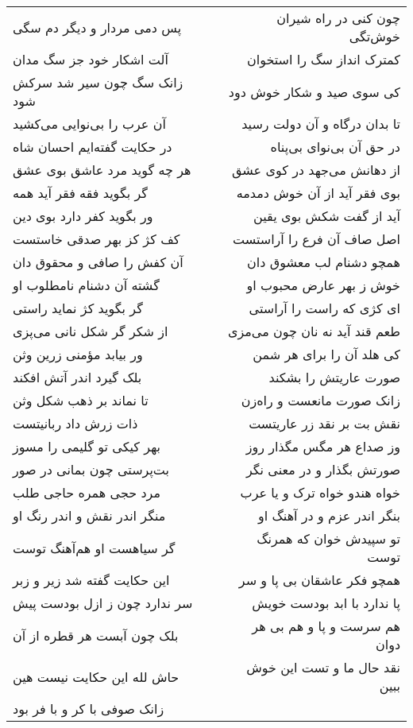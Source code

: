 \begin{center}
\begin{longtable}{l p{0.5cm} r}
\\
پس دمی مردار و دیگر دم سگی
&&
چون کنی در راه شیران خوش‌تگی
\\
آلت اشکار خود جز سگ مدان
&&
کمترک انداز سگ را استخوان
\\
زانک سگ چون سیر شد سرکش شود
&&
کی سوی صید و شکار خوش دود
\\
آن عرب را بی‌نوایی می‌کشید
&&
تا بدان درگاه و آن دولت رسید
\\
در حکایت گفته‌ایم احسان شاه
&&
در حق آن بی‌نوای بی‌پناه
\\
هر چه گوید مرد عاشق بوی عشق
&&
از دهانش می‌جهد در کوی عشق
\\
گر بگوید فقه فقر آید همه
&&
بوی فقر آید از آن خوش دمدمه
\\
ور بگوید کفر دارد بوی دین
&&
آید از گفت شکش بوی یقین
\\
کف کژ کز بهر صدقی خاستست
&&
اصل صاف آن فرع را آراستست
\\
آن کفش را صافی و محقوق دان
&&
همچو دشنام لب معشوق دان
\\
گشته آن دشنام نامطلوب او
&&
خوش ز بهر عارض محبوب او
\\
گر بگوید کژ نماید راستی
&&
ای کژی که راست را آراستی
\\
از شکر گر شکل نانی می‌پزی
&&
طعم قند آید نه نان چون می‌مزی
\\
ور بیابد مؤمنی زرین وثن
&&
کی هلد آن را برای هر شمن
\\
بلک گیرد اندر آتش افکند
&&
صورت عاریتش را بشکند
\\
تا نماند بر ذهب شکل وثن
&&
زانک صورت مانعست و راه‌زن
\\
ذات زرش داد ربانیتست
&&
نقش بت بر نقد زر عاریتست
\\
بهر کیکی تو گلیمی را مسوز
&&
وز صداع هر مگس مگذار روز
\\
بت‌پرستی چون بمانی در صور
&&
صورتش بگذار و در معنی نگر
\\
مرد حجی همره حاجی طلب
&&
خواه هندو خواه ترک و یا عرب
\\
منگر اندر نقش و اندر رنگ او
&&
بنگر اندر عزم و در آهنگ او
\\
گر سیاهست او هم‌آهنگ توست
&&
تو سپیدش خوان که همرنگ توست
\\
این حکایت گفته شد زیر و زبر
&&
همچو فکر عاشقان بی پا و سر
\\
سر ندارد چون ز ازل بودست پیش
&&
پا ندارد با ابد بودست خویش
\\
بلک چون آبست هر قطره از آن
&&
هم سرست و پا و هم بی هر دوان
\\
حاش لله این حکایت نیست هین
&&
نقد حال ما و تست این خوش ببین
\\
زانک صوفی با کر و با فر بود

\end{longtable}
\end{center}
